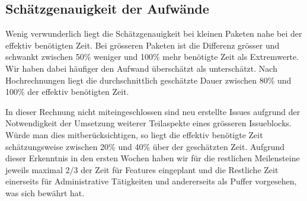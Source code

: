 	\subsection{Schätzgenauigkeit der Aufwände}
	Wenig verwunderlich liegt die Schätzgenauigkeit bei kleinen Paketen nahe bei der effektiv benötigten Zeit.
	Bei grösseren Paketen ist die Differenz grösser und schwankt zwischen 50\% weniger und 100\% mehr benötigte Zeit als Extremwerte.
	Wir haben dabei häufiger den Aufwand überschätzt als unterschätzt.
	Nach Hochrechnungen liegt die durchschnittlich geschätzte Dauer zwischen 80\% und 100\% der effektiv benötigten Zeit.
	
	In dieser Rechnung nicht miteingeschlossen sind neu erstellte Issues aufgrund der Notwendigkeit der Umsetzung weiterer Teilaspekte eines grösseren Issueblocks.
	Würde man dies mitberücksichtigen, so liegt die effektiv benötigte Zeit schätzungsweise zwischen 20\% und 40\% über der geschätzten Zeit.
	Aufgrund dieser Erkenntnis in den ersten Wochen haben wir für die restlichen Meilensteine jeweils maximal 2/3 der Zeit für Features eingeplant
	und die Restliche Zeit einerseits für Administrative Tätigkeiten und andererseits als Puffer vorgesehen, was sich bewährt hat. 
